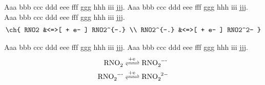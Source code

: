 \documentclass{article}
\begin{document}
Aaa  bbb ccc ddd eee fff ggg hhh iii jjj. Aaa  bbb ccc ddd eee fff ggg hhh iii jjj. Aaa
 bbb ccc ddd
eee fff ggg hhh iii jjj.
%
    \begin{align*}
    \ch{
        RNO2 &<=>[ + e- ] RNO2^{-.} \\
        RNO2^{-.} &<=>[ + e- ] RNO2^2-
    }
    \end{align*}

Aaa  bbb ccc ddd eee fff ggg hhh iii
jjj. Aaa  bbb ccc ddd eee fff ggg hhh iii jjj.
%
    \begin{align*}
        \cee{RNO2 &<=>C[+e] RNO2^{-.} \\
             RNO2^{-.} &<=>C[+e] RNO2^2-}
    \end{align*}
\end{document}
